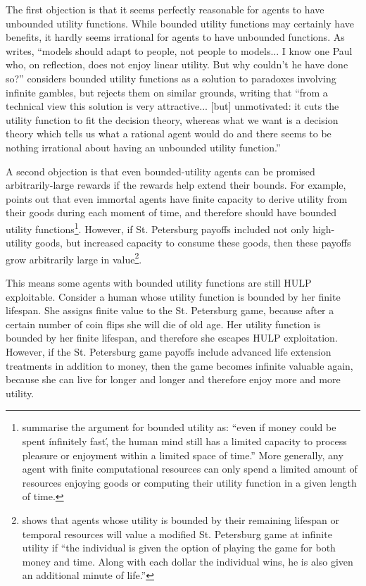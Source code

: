 \documentclass{article}
\begin{document}
The first objection is that it seems perfectly reasonable for agents to have unbounded utility functions. While bounded utility functions may certainly have benefits, it hardly seems irrational for agents to have unbounded functions. As \citep[pg. 26]{samuelson1977st} writes, ``models should adapt to people, not people to models... I know one Paul who, on reflection, does not enjoy linear utility. But why couldn't he have done so?'' \citep[pg. 496]{smith2014evaluative} considers bounded utility functions as a solution to paradoxes involving infinite gambles, but rejects them on similar grounds, writing that ``from a technical view this solution is very attractive... [but] unmotivated: it cuts the utility function to fit the decision theory, whereas what we want is a decision theory which tells us what a rational agent would do \textemdash{} and there seems to be nothing irrational about having an unbounded utility function.''

A second objection is that even bounded-utility agents can be promised arbitrarily-large rewards if the rewards help extend their bounds. For example, \citep{brito1975becker} points out that even immortal agents have finite capacity to derive utility from their goods during each moment of time, and therefore should have bounded utility functions\footnote{\citep{cowen1988time} summarise the argument for bounded utility as: ``even if money could be spent \'infinitely fast\', the human mind still has a limited capacity to process pleasure or enjoyment within a limited space of time.'' More generally, any agent with finite computational resources can only spend a limited amount of resources enjoying goods or computing their utility function in a given length of time.}. However, if St. Petersburg payoffs included not only high-utility goods, but increased capacity to consume these goods, then these payoffs grow arbitrarily large in value\footnote{\citep{cowen1988time} shows that agents whose utility is bounded by their remaining lifespan or temporal resources will value a modified St. Petersburg game at infinite utility if ``the individual is given the option of playing the game for both money and time. Along with each dollar the individual wins, he is also given an additional minute of life.''}. 

This means some agents with bounded utility functions are still HULP exploitable. Consider a human whose utility function is bounded by her finite lifespan. She assigns finite value to the St. Petersburg game, because after a certain number of coin flips she will die of old age. Her utility function is bounded by her finite lifespan, and therefore she escapes HULP exploitation. However, if the St. Petersburg game payoffs include advanced life extension treatments in addition to money, then the game becomes infinite valuable again, because she can live for longer and longer and therefore enjoy more and more utility.
\end{document}
